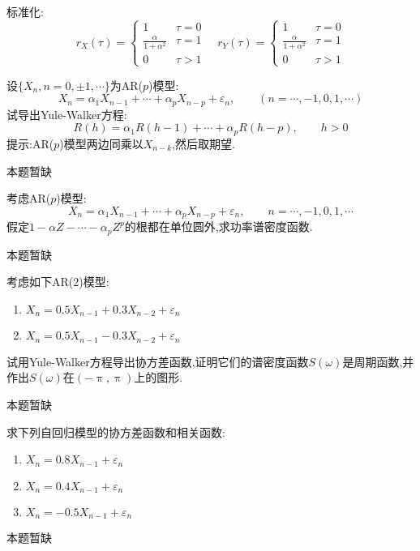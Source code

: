 \begin{solution}
\begin{enumerate}[label=(\roman*)]
	\end{enumerate}
	标准化:
	\[r_X(\tau)=\begin{cases}
			1                         & \tau=0 \\
			\frac{\alpha}{1+\alpha^2} & \tau=1 \\
			0                         & \tau>1
		\end{cases}
		\quad
		r_Y(\tau)=\begin{cases}
			1                         & \tau=0 \\
			\frac{\alpha}{1+\alpha^2} & \tau=1 \\
			0                         & \tau>1
		\end{cases}
	\]
\end{solution}

\begin{problem}{4.35}
设$\{X_n, n=0,\pm 1,\cdots \}$为AR($p$)模型:
\[X_n = \alpha_1 X_{n-1} + \cdots + \alpha_p X_{n-p} + \varepsilon_n,\qquad (n=\cdots ,-1,0,1,\cdots )\]
试导出Yule-Walker方程:
\[R(h) = \alpha_1R(h-1)+\cdots +\alpha_p R(h-p),\qquad h>0\]
提示:AR($p$)模型两边同乘以$X_{n-k}$,然后取期望.
\end{problem}
\begin{solution}
	本题暂缺
\end{solution}

\begin{problem}{4.36}
考虑AR($p$)模型:
\[X_n = \alpha_1 X_{n-1}+\cdots +\alpha_p X_{n-p}+\varepsilon_n,\qquad n=\cdots ,-1,0,1,\cdots \]
假定$1-\alpha Z-\cdots -\alpha_p Z^p$的根都在单位圆外,求功率谱密度函数.
\end{problem}
\begin{solution}
	本题暂缺
\end{solution}

\begin{problem}{4.37}
考虑如下AR(2)模型:
\begin{enumerate}[label=(\arabic*)]
	\item $X_n=0.5X_{n-1}+0.3X_{n-2}+\varepsilon_n$
	\item $X_n=0.5X_{n-1}-0.3X_{n-2}+\varepsilon_n$
\end{enumerate}
试用Yule-Walker方程导出协方差函数,证明它们的谱密度函数$S(\omega)$是周期函数,并作出$S(\omega)$在$(-\uppi,\uppi)$上的图形.
\end{problem}
\begin{solution}
	本题暂缺
\end{solution}

\begin{problem}{4.38}
求下列自回归模型的协方差函数和相关函数:
\begin{enumerate}[label=(\arabic*)]
	\item $X_n=0.8X_{n-1}+\varepsilon_n$
	\item $X_n=0.4X_{n-1}+\varepsilon_n$
	\item $X_n=-0.5X_{n-1}+\varepsilon_n$
\end{enumerate}
\end{problem}
\begin{solution}
	本题暂缺
\end{solution}

